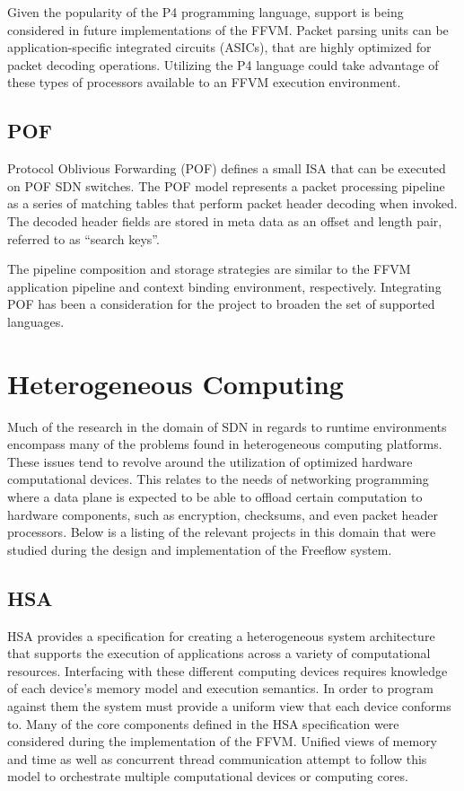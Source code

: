 Given the popularity of the P4 programming language, support is being
considered in future implementations of the FFVM. Packet parsing units can be
application-specific integrated circuits (ASICs), that are highly optimized for
packet decoding operations. Utilizing the P4 language could take
advantage of these types of processors available to an FFVM execution environment.

\subsection{POF}
\label{related:pof}
Protocol Oblivious Forwarding (POF) \cite{pof} defines a small ISA that can
be executed on POF SDN switches. The POF model represents a packet processing
pipeline as a series of matching tables that perform packet header decoding
when invoked. The decoded header fields are stored in meta data as an offset
and length pair, referred to as ``search keys''.

The pipeline composition and storage strategies are similar to the FFVM application
pipeline and context binding environment, respectively. Integrating POF has
been a consideration for the project to broaden the set of supported languages.

\section{Heterogeneous Computing}
\label{related:hcp}
Much of the research in the domain of SDN in regards to runtime environments
encompass many of the problems found in heterogeneous computing platforms.
These issues tend to revolve around the utilization of optimized hardware
computational devices. This relates to the needs of networking programming
where a data plane is expected to be able to offload certain computation to
hardware components, such as encryption, checksums, and even packet header
processors. Below is a listing of the relevant projects in this domain that
were studied during the design and implementation of the Freeflow system.

\subsection{HSA}
\label{related:hsa}
HSA \cite{hsa} provides a specification for creating a heterogeneous
system architecture that supports the execution of applications across a
variety of computational resources. Interfacing with these different computing
devices requires knowledge of each device's memory model and execution
semantics. In order to program against them the system must provide a
uniform view that each device conforms to. Many of the core components defined
in the HSA specification were considered during the implementation of the FFVM.
 Unified views of memory and time as well as concurrent thread communication
 attempt to follow this model to orchestrate multiple computational devices or
 computing cores.

